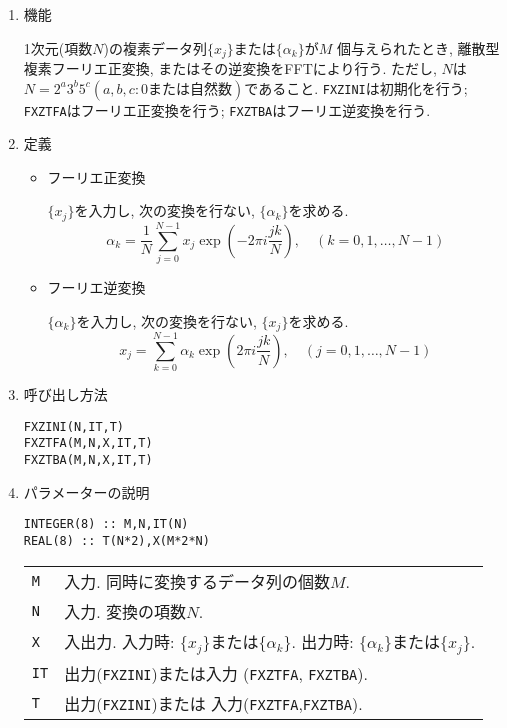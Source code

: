 \documentclass[a4j]{jsarticle}
\begin{document}
\begin{enumerate}
  \item 機能 

    1次元(項数$N$)の複素データ列$\{x_j\}$または$\{\alpha_k\}$が$M$
    個与えられたとき, 
    離散型複素フーリエ正変換, またはその逆変換をFFTにより行う. ただし,
    $N$は$N=2^a3^b5^c(a,b,c: 0または自然数)$であること. 
     \texttt{FXZINI}は初期化を行う;
     \texttt{FXZTFA}はフーリエ正変換を行う;
     \texttt{FXZTBA}はフーリエ逆変換を行う.

  \item 定義
    \begin{itemize}
     \item フーリエ正変換

       $\{x_j\}$を入力し, 次の変換を行ない, $\{\alpha_k\}$を求める.
       \[
       \alpha_k=\frac1N\sum^{N-1}_{j=0}x_j\exp\left(-2\pi i\frac{jk}N\right),
       \quad (k=0,1,\ldots,N-1)
       \]

     \item フーリエ逆変換

       $\{\alpha_k\}$を入力し, 次の変換を行ない, $\{x_j\}$を求める.
       \[
      x_j=\sum^{N-1}_{k=0}\alpha_k\exp\left(2\pi i\frac{jk}N\right),
       \quad (j=0,1,\ldots,N-1)\]

     \end{itemize}    
  \item 呼び出し方法 

    \texttt{FXZINI(N,IT,T)}\\
    \texttt{FXZTFA(M,N,X,IT,T)}\\
    \texttt{FXZTBA(M,N,X,IT,T)}

\item パラメーターの説明

  \vspace{-2ex}

     \begin{verbatim}
INTEGER(8) :: M,N,IT(N)
REAL(8) :: T(N*2),X(M*2*N)
\end{verbatim}

  \vspace{-1ex}
     
    \begin{tabular}{ll}
      \texttt{M}   & 入力. 同時に変換するデータ列の個数$M$.\\
      \texttt{N}   & 入力. 変換の項数$N$.\\
      \texttt{X}   & 入出力. 入力時: $\{x_j\}$または$\{\alpha_k\}$.
                    出力時: $\{\alpha_k\}$または$\{x_j\}$.\\
      \texttt{IT}   & 出力(\texttt{FXZINI})または入力
      (\texttt{FXZTFA}, \texttt{FXZTBA}).\\
      \texttt{T}   & 出力(\texttt{FXZINI})または
入力(\texttt{FXZTFA},\texttt{FXZTBA}).
    \end{tabular}


\end{enumerate}
\end{document}
